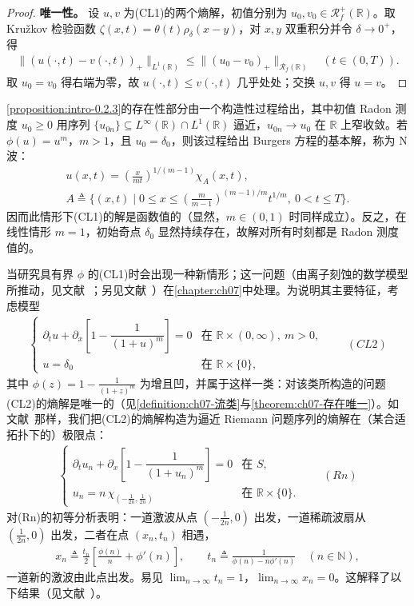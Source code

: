 \documentclass[../main.tex]{subfiles}
\begin{document}
\begin{proof}
\textbf{唯一性。} 设 $u,v$ 为(CL1)的两个熵解，初值分别为 $u_0,v_0\in\mathscr{R}^+_f(\mathbb{R})$。取 Kružkov 检验函数 $\zeta(x,t)=\theta(t)\rho_\delta(x-y)$，对 $x,y$ 双重积分并令 $\delta\to0^+$，得
\begin{align*}
\|(u(\cdot,t)-v(\cdot,t))_+\|_{L^1(\mathbb{R})}\leqslant\|(u_0-v_0)_+\|_{\mathscr{R}_f(\mathbb{R})}
\quad (t\in(0,T)).
\end{align*}
取 $u_0=v_0$ 得右端为零，故 $u(\cdot,t)\leqslant v(\cdot,t)$ 几乎处处；交换 $u,v$ 得 $u=v$。
\end{proof}

\cref{proposition:intro-0.2.3}的存在性部分由一个构造性过程给出，其中初值 Radon 测度 $u_0\geqslant0$ 用序列 $\{u_{0n}\}\subseteq L^\infty(\mathbb{R})\cap L^1(\mathbb{R})$ 逼近，$u_{0n}\to u_0$ 在 $\mathbb{R}$ 上窄收敛。若 $\phi(u)=u^m$，$m>1$，且 $u_0=\delta_0$，则该过程给出 Burgers 方程的基本解，称为 N 波：
\begin{align}
u(x,t) = \left(\frac{x}{mt}\right)^{1/(m-1)}\chi_A(x,t), \label{align:intro-0.16a}\\
A \triangleq  \{(x,t)\mid 0\leqslant x\leqslant\left(\frac{m}{m-1}\right)^{(m-1)/m}t^{1/m},\ 0<t\leqslant T\}. \label{align:intro-0.16b}
\end{align}
因而此情形下(CL1)的解是函数值的（显然，$m\in(0,1)$ 时同样成立）。反之，在线性情形 $m=1$，初始奇点 $\delta_0$ 显然持续存在，故解对所有时刻都是 Radon 测度值的。

当研究具有界 $\phi$ 的(CL1)时会出现一种新情形；这一问题（由离子刻蚀的数学模型所推动，见文献~\cite{ref88}；另见文献~\cite{ref50}）在\cref{chapter:ch07}中处理。为说明其主要特征，考虑模型
\begin{align*}
\begin{cases}
\partial_t u + \partial_x\left[1-\dfrac{1}{(1+u)^m}\right] = 0 & \text{在 }\mathbb{R}\times(0,\infty),\ m>0,\\
u=\delta_0 & \text{在 }\mathbb{R}\times\{0\},
\end{cases}
\qquad(CL2)
\end{align*}
其中 $\phi(z)=1-\frac{1}{(1+z)^m}$ 为增且凹，并属于这样一类：对该类所构造的问题(CL2)的熵解是唯一的（见\cref{definition:ch07-流类}与\cref{theorem:ch07-存在唯一}）。如文献~\cite{ref67}那样，我们把(CL2)的熵解构造为逼近 Riemann 问题序列的熵解在（某合适拓扑下的）极限点：
\begin{align*}
\begin{cases}
\partial_t u_n + \partial_x\left[1-\dfrac{1}{(1+u_n)^m}\right] = 0 & \text{在 }S,\\
u_n = n\,\chi_{(-\frac{1}{2n},\frac{1}{2n})} & \text{在 }\mathbb{R}\times\{0\}.
\end{cases}
\qquad(Rn)
\end{align*}
对(Rn)的初等分析表明：一道激波从点 $(-\frac{1}{2n},0)$ 出发，一道稀疏波扇从 $(\frac{1}{2n},0)$ 出发，二者在点 $(x_n,t_n)$ 相遇，
\begin{align*}
x_n \triangleq  \frac{t_n}{2}\left[\frac{\phi(n)}{n}+\phi'(n)\right],
\qquad
t_n \triangleq  \frac{1}{\phi(n)-n\phi'(n)} \quad (n\in\mathbb{N}),
\end{align*}
一道新的激波由此点出发。易见 $\lim_{n\to\infty}t_n=1$，$\lim_{n\to\infty}x_n=0$。这解释了以下结果（见文献~\cite{ref18}）。
\end{document}
